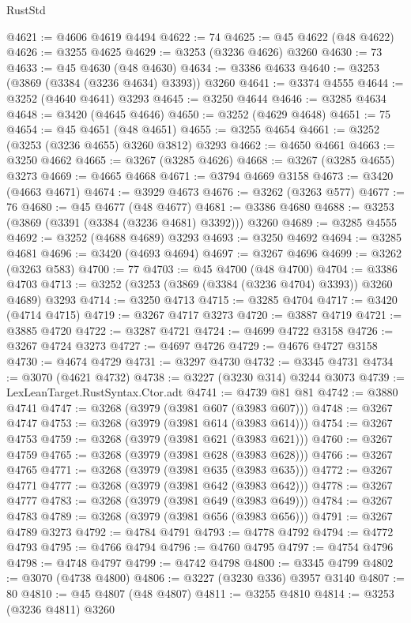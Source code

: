\begin{lexlean}{RustStd}
\begin{coremodule}
{\begin{coremodule}
{{{{{{{{{{{{{{{{{{{{{{{{{{{{{{{{{{{{{{{@4621 := @4606 @4619 @4494
@4622 := 74
@4625 := @45 @4622 (@48 @4622)
@4626 := @3255 @4625
@4629 := @3253 (@3236 @4626) @3260
@4630 := 73
@4633 := @45 @4630 (@48 @4630)
@4634 := @3386 @4633
@4640 := @3253 (@3869 (@3384 (@3236 @4634) @3393)) @3260
@4641 := @3374 @4555
@4644 := @3252 (@4640 @4641) @3293
@4645 := @3250 @4644
@4646 := @3285 @4634
@4648 := @3420 (@4645 @4646)
@4650 := @3252 (@4629 @4648)
@4651 := 75
@4654 := @45 @4651 (@48 @4651)
@4655 := @3255 @4654
@4661 := @3252 (@3253 (@3236 @4655) @3260 @3812) @3293
@4662 := @4650 @4661
@4663 := @3250 @4662
@4665 := @3267 (@3285 @4626)
@4668 := @3267 (@3285 @4655) @3273
@4669 := @4665 @4668
@4671 := @3794 @4669 @3158
@4673 := @3420 (@4663 @4671)
@4674 := @3929 @4673
@4676 := @3262 (@3263 @577)
@4677 := 76
@4680 := @45 @4677 (@48 @4677)
@4681 := @3386 @4680
@4688 := @3253 (@3869 (@3391 (@3384 (@3236 @4681) @3392))) @3260
@4689 := @3285 @4555
@4692 := @3252 (@4688 @4689) @3293
@4693 := @3250 @4692
@4694 := @3285 @4681
@4696 := @3420 (@4693 @4694)
@4697 := @3267 @4696
@4699 := @3262 (@3263 @583)
@4700 := 77
@4703 := @45 @4700 (@48 @4700)
@4704 := @3386 @4703
@4713 := @3252 (@3253 (@3869 (@3384 (@3236 @4704) @3393)) @3260 @4689) @3293
@4714 := @3250 @4713
@4715 := @3285 @4704
@4717 := @3420 (@4714 @4715)
@4719 := @3267 @4717 @3273
@4720 := @3887 @4719
@4721 := @3885 @4720
@4722 := @3287 @4721
@4724 := @4699 @4722 @3158
@4726 := @3267 @4724 @3273
@4727 := @4697 @4726
@4729 := @4676 @4727 @3158
@4730 := @4674 @4729
@4731 := @3297 @4730
@4732 := @3345 @4731
@4734 := @3070 (@4621 @4732)
@4738 := @3227 (@3230 @314) @3244 @3073
@4739 := LexLeanTarget.RustSyntax.Ctor.adt
@4741 := @4739 @81 @81
@4742 := @3880 @4741
@4747 := @3268 (@3979 (@3981 @607 (@3983 @607)))
@4748 := @3267 @4747
@4753 := @3268 (@3979 (@3981 @614 (@3983 @614)))
@4754 := @3267 @4753
@4759 := @3268 (@3979 (@3981 @621 (@3983 @621)))
@4760 := @3267 @4759
@4765 := @3268 (@3979 (@3981 @628 (@3983 @628)))
@4766 := @3267 @4765
@4771 := @3268 (@3979 (@3981 @635 (@3983 @635)))
@4772 := @3267 @4771
@4777 := @3268 (@3979 (@3981 @642 (@3983 @642)))
@4778 := @3267 @4777
@4783 := @3268 (@3979 (@3981 @649 (@3983 @649)))
@4784 := @3267 @4783
@4789 := @3268 (@3979 (@3981 @656 (@3983 @656)))
@4791 := @3267 @4789 @3273
@4792 := @4784 @4791
@4793 := @4778 @4792
@4794 := @4772 @4793
@4795 := @4766 @4794
@4796 := @4760 @4795
@4797 := @4754 @4796
@4798 := @4748 @4797
@4799 := @4742 @4798
@4800 := @3345 @4799
@4802 := @3070 (@4738 @4800)
@4806 := @3227 (@3230 @336) @3957 @3140
@4807 := 80
@4810 := @45 @4807 (@48 @4807)
@4811 := @3255 @4810
@4814 := @3253 (@3236 @4811) @3260
}}}}}}}}}}}}}}}}}}}}}}}}}}}}}}}}}}}}}}}
\end{coremodule}}
\end{coremodule}
\end{lexlean}
